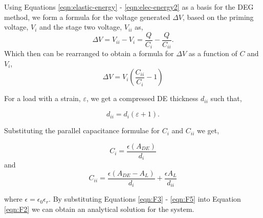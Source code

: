 Using Equations \ref{eqn:elastic-energy} - \ref{eqn:elec-energy2} as a basis for the DEG method, we form a formula for the voltage generated $\Delta V$, based on the priming voltage, $V_i$ and the stage two voltage, $V_{ii}$ as,
\begin{equation}
	\Delta V = V_{ii} - V_i = \frac{Q}{C_{i}} - \frac{Q}{C_{ii}}.
	\label{eqn:F1}
\end{equation}
Which then can be rearranged to obtain a formula for $\Delta V$ as a function of $C$ and $V_i$,
\begin{equation}
	\Delta V = V_i \left(\frac{C_{ii}}{C_i} - 1\right)
	\label{eqn:F2}
\end{equation}

For a load with a strain, $\varepsilon$, we get a compressed DE thickness $d_{ii}$ such that,

\begin{equation}
	d_{ii} = d_i(\varepsilon + 1).
	\label{eqn:F3}
\end{equation}

Substituting the parallel capacitance formulae for $C_i$ and $C_{ii}$ we get,

\begin{equation}
	C_i = \frac{\epsilon (A_{DE})}{d_i}
	\label{eqn:F4}
\end{equation}
and
\begin{equation}
	C_{ii} = \frac{\epsilon (A_{DE} - A_L)}{d_i} + \frac{\epsilon A_L}{d_{ii}}
	\label{eqn:F5}
\end{equation}

where $\epsilon = \epsilon_0\epsilon_r$. By substituting Equations \ref{eqn:F3} - \ref{eqn:F5} into Equation \ref{eqn:F2} we can obtain an analytical solution for the system.


